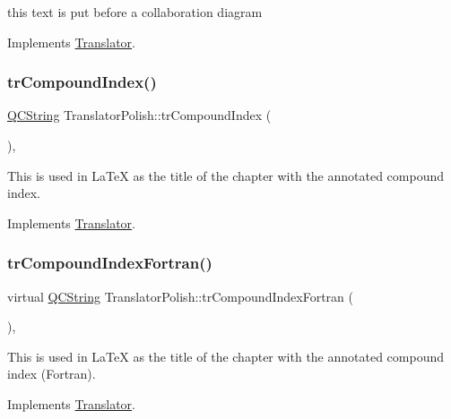 this text is put before a collaboration diagram 

Implements \mbox{\hyperlink{class_translator}{Translator}}.

\mbox{\label{class_translator_polish_a1bd65c90ef68868e97c50b22fddeb273}} 
\subsubsection{\texorpdfstring{trCompoundIndex()}{trCompoundIndex()}}
{\footnotesize\ttfamily \mbox{\hyperlink{class_q_c_string}{Q\+C\+String}} Translator\+Polish\+::tr\+Compound\+Index (\begin{DoxyParamCaption}{ }\end{DoxyParamCaption})\hspace{0.3cm}{\ttfamily [inline]}, {\ttfamily [virtual]}}

This is used in La\+TeX as the title of the chapter with the annotated compound index. 

Implements \mbox{\hyperlink{class_translator}{Translator}}.

\mbox{\label{class_translator_polish_ac040527acce76d3ae8e644ea6932984a}} 
\subsubsection{\texorpdfstring{trCompoundIndexFortran()}{trCompoundIndexFortran()}}
{\footnotesize\ttfamily virtual \mbox{\hyperlink{class_q_c_string}{Q\+C\+String}} Translator\+Polish\+::tr\+Compound\+Index\+Fortran (\begin{DoxyParamCaption}{ }\end{DoxyParamCaption})\hspace{0.3cm}{\ttfamily [inline]}, {\ttfamily [virtual]}}

This is used in La\+TeX as the title of the chapter with the annotated compound index (Fortran). 

Implements \mbox{\hyperlink{class_translator}{Translator}}.

\mbox{\label{class_translator_polish_ada057fd3ef44bcd29f2048b79089417e}} 
